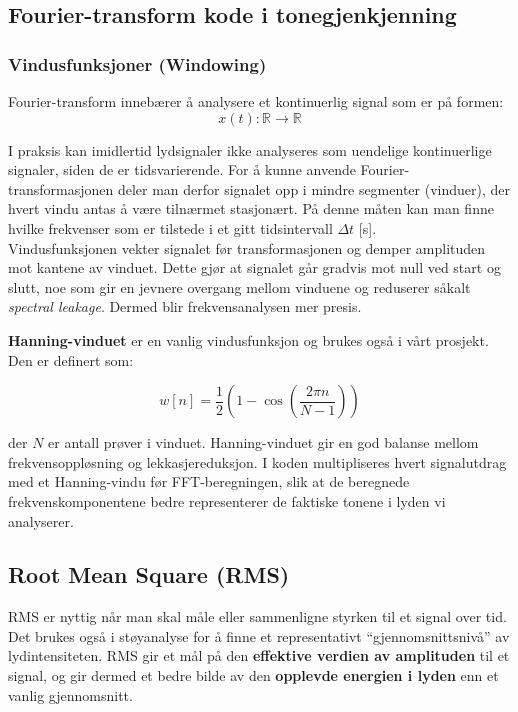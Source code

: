 \subsection{Fourier-transform kode i tonegjenkjenning}

\subsubsection{Vindusfunksjoner (Windowing)}
Fourier-transform innebærer å analysere et kontinuerlig signal som er på formen:
\[
x(t): \mathbb{R} \rightarrow \mathbb{R}
\]

\noindent
I praksis kan imidlertid lydsignaler ikke analyseres som uendelige kontinuerlige signaler, siden de er tidsvarierende. 
For å kunne anvende Fourier-transformasjonen deler man derfor signalet opp i mindre segmenter (vinduer), der hvert vindu antas å være tilnærmet stasjonært. 
På denne måten kan man finne hvilke frekvenser som er tilstede i et gitt tidsintervall $\Delta t$ [s]. \\

Vindusfunksjonen vekter signalet før transformasjonen og demper amplituden mot kantene av vinduet. 
Dette gjør at signalet går gradvis mot null ved start og slutt, noe som gir en jevnere overgang mellom vinduene og reduserer såkalt \textit{spectral leakage}. 
Dermed blir frekvensanalysen mer presis. 

\textbf{Hanning-vinduet} er en vanlig vindusfunksjon og brukes også i vårt prosjekt. Den er definert som:

\begin{equation}
    w[n]=\frac{1}{2} \left( 1 - \cos{\left( \frac{2 \pi n}{N - 1}\right)} \right)
    \label{eq:HanningVinduFunksjon}
\end{equation}

\noindent
der $N$ er antall prøver i vinduet. 
Hanning-vinduet gir en god balanse mellom frekvensoppløsning og lekkasjereduksjon. 
I koden multipliseres hvert signalutdrag med et Hanning-vindu før FFT-beregningen, slik at de beregnede frekvenskomponentene bedre representerer de faktiske tonene i lyden vi analyserer.


\subsection{Root Mean Square (RMS)}
RMS er nyttig når man skal måle eller sammenligne styrken til et signal over tid. Det brukes også i støyanalyse for å finne et representativt “gjennomsnittsnivå” av lydintensiteten. RMS gir et mål på den \textbf{effektive verdien av amplituden} til et signal, og gir dermed et bedre bilde av den \textbf{opplevde energien i lyden} enn et vanlig gjennomsnitt.

